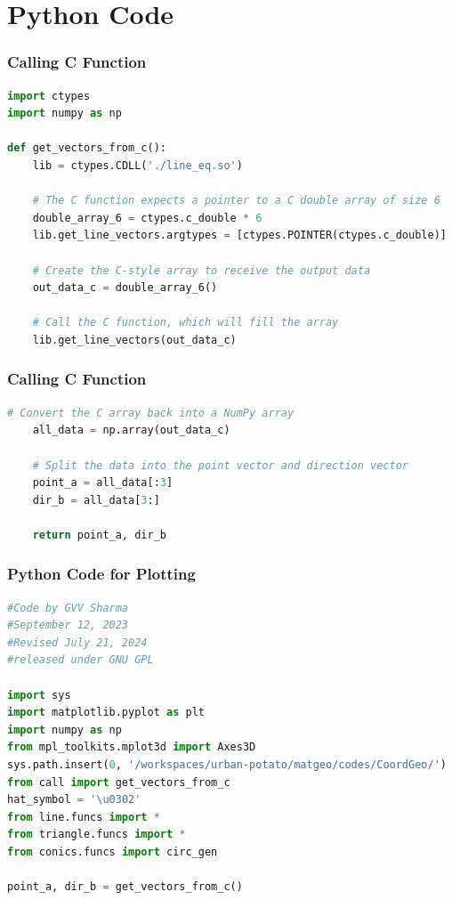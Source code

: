 \documentclass{beamer}
\theoremstyle{remark}
\numberwithin{equation}{section}
\begin{document}
\section{Python Code}
\begin{frame}[fragile]
\frametitle{Calling C Function}
\begin{lstlisting}[language=Python]
import ctypes
import numpy as np

def get_vectors_from_c():
    lib = ctypes.CDLL('./line_eq.so')

    # The C function expects a pointer to a C double array of size 6
    double_array_6 = ctypes.c_double * 6
    lib.get_line_vectors.argtypes = [ctypes.POINTER(ctypes.c_double)]
    
    # Create the C-style array to receive the output data
    out_data_c = double_array_6()
    
    # Call the C function, which will fill the array
    lib.get_line_vectors(out_data_c)
\end{lstlisting}
\end{frame}
\begin{frame}[fragile]
\frametitle{Calling C Function}
\begin{lstlisting}[language=Python]
# Convert the C array back into a NumPy array
    all_data = np.array(out_data_c)
    
    # Split the data into the point vector and direction vector
    point_a = all_data[:3]
    dir_b = all_data[3:]
    
    return point_a, dir_b
    \end{lstlisting}
\end{frame}
\begin{frame}[fragile]
\frametitle{Python Code for Plotting}
\begin{lstlisting}[language=Python]
#Code by GVV Sharma
#September 12, 2023
#Revised July 21, 2024
#released under GNU GPL

import sys
import matplotlib.pyplot as plt
import numpy as np
from mpl_toolkits.mplot3d import Axes3D
sys.path.insert(0, '/workspaces/urban-potato/matgeo/codes/CoordGeo/') 
from call import get_vectors_from_c
hat_symbol = '\u0302'
from line.funcs import *
from triangle.funcs import *
from conics.funcs import circ_gen

point_a, dir_b = get_vectors_from_c()
 
\end{lstlisting}
\end{frame}
\end{document}
